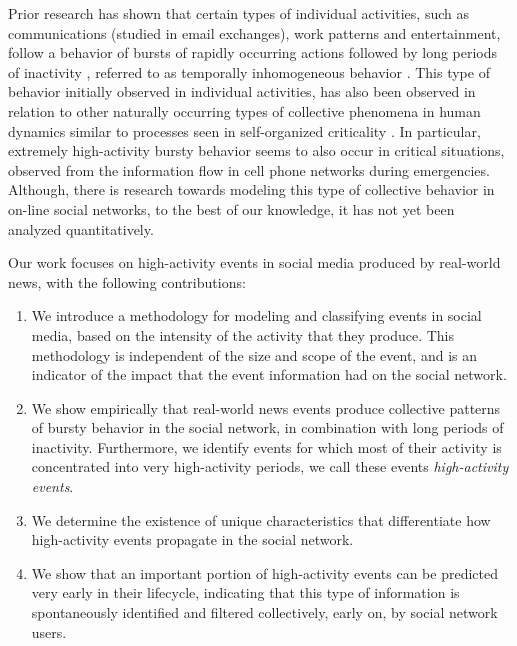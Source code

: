 \documentclass[10pt,letterpaper]{article}
\newcommand{\newtext}[1]{{\leavevmode\color{blue}#1}}
\begin{document}
Prior research has shown that certain types of individual activities,
such as communications (studied in email exchanges), work patterns and
entertainment, follow a behavior of bursts of rapidly occurring
actions followed by long periods of inactivity
\cite{barabasi2005origin}, referred to as {temporally inhomogeneous}
behavior \cite{karsai2012universal}.  This type of behavior initially
observed in individual activities, has also been observed in relation
to other naturally occurring types of collective phenomena in human
dynamics similar to processes seen in self-organized criticality
\cite{karsai2012universal}.  In particular, extremely high-activity
bursty behavior seems to also occur in critical situations, observed
from the information flow in cell phone networks during
emergencies\cite{gao2014quantifying}.  Although, there is research
towards modeling this type of collective behavior
\cite{yan2013information} in on-line social networks, to the best of
our knowledge, it has not yet been analyzed quantitatively.








Our work focuses on high-activity events in social media produced by
real-world news, with the following contributions:
\begin{enumerate}

\item We introduce a methodology for modeling and classifying
events in social media, based on the intensity of the activity that they
produce. This methodology is independent of the size and scope of the event,
and is an indicator of the impact that the event information had on the social network.

\item We show empirically that real-world news events produce collective
patterns of bursty behavior in the social network, in combination with long periods of
inactivity. Furthermore, we identify events for which most of their activity
is concentrated into very high-activity periods, we call these events {\em
high-activity events}.

\item We determine the existence of unique characteristics that
differentiate how high-activity events propagate in the social network.

\item We show that an important portion of high-activity events can be
predicted very early in their lifecycle, indicating that this type
of information is spontaneously identified and filtered collectively, early
on, by social network users.

\end{enumerate}
\end{document}
